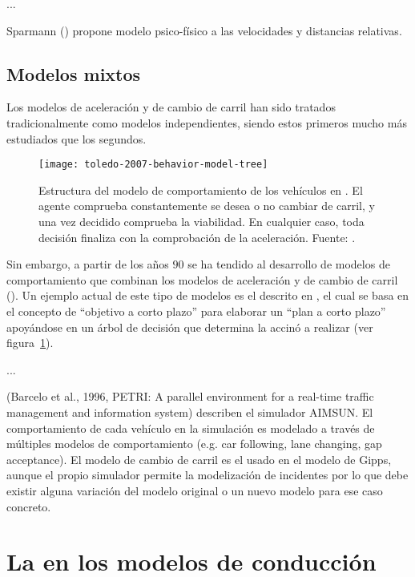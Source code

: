 ...

Sparmann (\cite{Sparmann1978}) propone modelo psico-físico a las velocidades y distancias relativas.

\subsection{Modelos mixtos}

Los modelos de aceleración y de cambio de carril han sido tratados tradicionalmente como modelos independientes, siendo estos primeros mucho más estudiados que los segundos.

\begin{figure}
	\texttt{[image: toledo-2007-behavior-model-tree]}
	\caption{Estructura del modelo de comportamiento de los vehículos en \cite{Toledo2007}. El agente comprueba constantemente se desea o no cambiar de carril, y una vez decidido comprueba la viabilidad. En cualquier caso, toda decisión finaliza con la comprobación de la aceleración. Fuente: \cite{Toledo2007}.}
	\label{fig:toledo-2007-behavior-model-tree}
\end{figure}

Sin embargo, a partir de los años $90$ se ha tendido al desarrollo de modelos de comportamiento que combinan los modelos de aceleración y de cambio de carril (\cite{Ma2004}). Un ejemplo actual de este tipo de modelos es el descrito en \cite{Toledo2007}, el cual se basa en el concepto de \enquote{objetivo a corto plazo} para elaborar un \enquote{plan a corto plazo} apoyándose en un árbol de decisión que determina la accinó a realizar (ver figura~\ref{fig:toledo-2007-behavior-model-tree}).

...

(Barcelo et al., 1996, PETRI: A parallel environment for a real-time traffic management and information system) describen el simulador AIMSUN. El comportamiento de cada vehículo en la simulación es modelado a través de múltiples modelos de comportamiento (e.g. car following, lane changing, gap acceptance). El modelo de cambio de carril es el usado en el modelo de Gipps, aunque el propio simulador permite la modelización de incidentes por lo que debe existir alguna variación del modelo original o un nuevo modelo para ese caso concreto.

\section{La  en los modelos de conducción}

